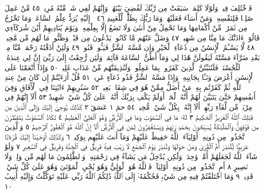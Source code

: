 فَٱخْتُلِفَ فِيهِۚ وَلَوْلَا كَلِمَةࣱ سَبَقَتْ مِن رَّبِّكَ لَقُضِيَ
بَيْنَهُمْۚ وَإِنَّهُمْ لَفِي شَكࣲّ مِّنْهُ مُرِيبࣲ ٤٥ مَّنْ عَمِلَ صَٰلِحࣰا
فَلِنَفْسِهِۦۖ وَمَنْ أَسَآءَ فَعَلَيْهَاۗ وَمَا رَبُّكَ بِظَلَّٰمࣲ لِّلْعَبِيدِ ٤٦
۞ إِلَيْهِ يُرَدُّ عِلْمُ ٱلسَّاعَةِۚ وَمَا تَخْرُجُ مِن ثَمَرَٰتࣲ مِّنْ أَكْمَامِهَا
وَمَا تَحْمِلُ مِنْ أُنثَىٰ وَلَا تَضَعُ إِلَّا بِعِلْمِهِۦۚ وَيَوْمَ يُنَادِيهِمْ أَيْنَ
شُرَكَآءِي قَالُوٓا۟ ءَاذَنَّٰكَ مَا مِنَّا مِن شَهِيدࣲ ٤٧ وَضَلَّ عَنْهُم
مَّا كَانُوا۟ يَدْعُونَ مِن قَبْلُۖ وَظَنُّوا۟ مَا لَهُم مِّن مَّحِيصࣲ ٤٨
لَّا يَسْـَٔمُ ٱلْإِنسَٰنُ مِن دُعَآءِ ٱلْخَيْرِ وَإِن مَّسَّهُ ٱلشَّرُّ فَيَـُٔوسࣱ
قَنُوطࣱ ٤٩ وَلَئِنْ أَذَقْنَٰهُ رَحْمَةࣰ مِّنَّا مِنۢ بَعْدِ ضَرَّآءَ مَسَّتْهُ
لَيَقُولَنَّ هَٰذَا لِي وَمَآ أَظُنُّ ٱلسَّاعَةَ قَآئِمَةࣰ وَلَئِن رُّجِعْتُ إِلَىٰ
رَبِّيٓ إِنَّ لِي عِندَهُۥ لَلْحُسْنَىٰۚ فَلَنُنَبِّئَنَّ ٱلَّذِينَ كَفَرُوا۟ بِمَا عَمِلُوا۟
وَلَنُذِيقَنَّهُم مِّنْ عَذَابٍ غَلِيظࣲ ٥٠ وَإِذَآ أَنْعَمْنَا عَلَى ٱلْإِنسَٰنِ
أَعْرَضَ وَنَـَٔا بِجَانِبِهِۦ وَإِذَا مَسَّهُ ٱلشَّرُّ فَذُو دُعَآءٍ
عَرِيضࣲ ٥١ قُلْ أَرَءَيْتُمْ إِن كَانَ مِنْ عِندِ ٱللَّهِ ثُمَّ كَفَرْتُم بِهِۦ
مَنْ أَضَلُّ مِمَّنْ هُوَ فِي شِقَاقِۭ بَعِيدࣲ ٥٢ سَنُرِيهِمْ ءَايَٰتِنَا
فِي ٱلْأٓفَاقِ وَفِيٓ أَنفُسِهِمْ حَتَّىٰ يَتَبَيَّنَ لَهُمْ أَنَّهُ ٱلْحَقُّۗ
أَوَلَمْ يَكْفِ بِرَبِّكَ أَنَّهُۥ عَلَىٰ كُلِّ شَيْءࣲ شَهِيدٌ ٥٣ أَلَآ إِنَّهُمْ
فِي مِرْيَةࣲ مِّن لِّقَآءِ رَبِّهِمْۗ أَلَآ إِنَّهُۥ بِكُلِّ شَيْءࣲ مُّحِيطُۢ ٥٤
حمٓ ١ عٓسٓقٓ ٢ كَذَٰلِكَ يُوحِيٓ إِلَيْكَ وَإِلَى ٱلَّذِينَ مِن قَبْلِكَ
ٱللَّهُ ٱلْعَزِيزُ ٱلْحَكِيمُ ٣ لَهُۥ مَا فِي ٱلسَّمَٰوَٰتِ وَمَا فِي ٱلْأَرْضِۖ
وَهُوَ ٱلْعَلِيُّ ٱلْعَظِيمُ ٤ تَكَادُ ٱلسَّمَٰوَٰتُ يَتَفَطَّرْنَ مِن فَوْقِهِنَّۚ
وَٱلْمَلَٰٓئِكَةُ يُسَبِّحُونَ بِحَمْدِ رَبِّهِمْ وَيَسْتَغْفِرُونَ لِمَن فِي
ٱلْأَرْضِۗ أَلَآ إِنَّ ٱللَّهَ هُوَ ٱلْغَفُورُ ٱلرَّحِيمُ ٥ وَٱلَّذِينَ ٱتَّخَذُوا۟
مِن دُونِهِۦٓ أَوْلِيَآءَ ٱللَّهُ حَفِيظٌ عَلَيْهِمْ وَمَآ أَنتَ عَلَيْهِم بِوَكِيلࣲ ٦
وَكَذَٰلِكَ أَوْحَيْنَآ إِلَيْكَ قُرْءَانًا عَرَبِيࣰّا لِّتُنذِرَ أُمَّ ٱلْقُرَىٰ وَمَنْ
حَوْلَهَا وَتُنذِرَ يَوْمَ ٱلْجَمْعِ لَا رَيْبَ فِيهِۚ فَرِيقࣱ فِي ٱلْجَنَّةِ وَفَرِيقࣱ فِي
ٱلسَّعِيرِ ٧ وَلَوْ شَآءَ ٱللَّهُ لَجَعَلَهُمْ أُمَّةࣰ وَٰحِدَةࣰ وَلَٰكِن يُدْخِلُ مَن
يَشَآءُ فِي رَحْمَتِهِۦۚ وَٱلظَّٰلِمُونَ مَا لَهُم مِّن وَلِيࣲّ وَلَا نَصِيرٍ ٨ أَمِ
ٱتَّخَذُوا۟ مِن دُونِهِۦٓ أَوْلِيَآءَۖ فَٱللَّهُ هُوَ ٱلْوَلِيُّ وَهُوَ يُحْيِ ٱلْمَوْتَىٰ وَهُوَ
عَلَىٰ كُلِّ شَيْءࣲ قَدِيرࣱ ٩ وَمَا ٱخْتَلَفْتُمْ فِيهِ مِن شَيْءࣲ فَحُكْمُهُۥٓ
إِلَى ٱللَّهِۚ ذَٰلِكُمُ ٱللَّهُ رَبِّي عَلَيْهِ تَوَكَّلْتُ وَإِلَيْهِ أُنِيبُ ١٠
